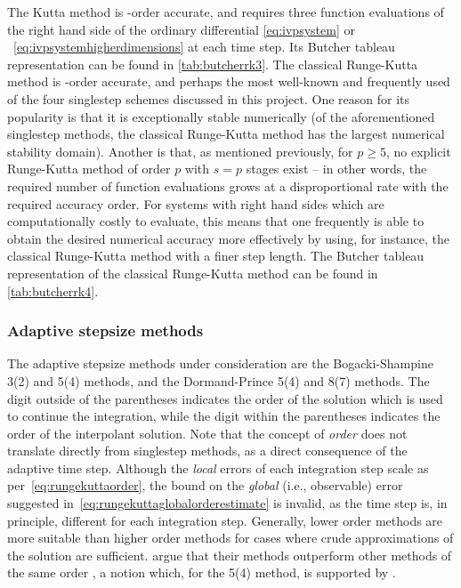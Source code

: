 The Kutta method is -order accurate, and requires three function
evaluations of the right hand side of the ordinary differential
\cref{eq:ivpsystem} or ~\eqref{eq:ivpsystemhigherdimensions} at each time
step. Its Butcher tableau representation can be found in \cref{tab:butcherrk3}.
The classical Runge-Kutta method is -order accurate, and perhaps the most
well-known and frequently used of the four singlestep schemes discussed in this
project. One reason for its popularity is that it is exceptionally stable
numerically (of the aforementioned singlestep methods, the classical
Runge-Kutta method has the largest numerical stability domain). Another is that,
as mentioned previously, for $p\geq5$, no explicit Runge-Kutta method of order
$p$ with $s=p$ stages exist
\parencite[p.173]{hairer1993solving} -- in other words,
the required number of function evaluations grows at a disproportional rate with
the required accuracy order. For systems with right hand sides which are
computationally costly to evaluate, this means that one frequently is able to
obtain the desired numerical accuracy more effectively by using, for instance,
the classical Runge-Kutta method with a finer step length. The Butcher tableau
representation of the classical Runge-Kutta method can be found in
\cref{tab:butcherrk4}.


\clearpage


\subsubsection{Adaptive stepsize methods}
\label{ssub:adaptive_stepsize_methods}

The adaptive stepsize methods under consideration are the Bogacki-Shampine
3(2) and 5(4) methods, and the Dormand-Prince 5(4) and 8(7) methods. The digit
outside of the parentheses indicates the order of the solution which is used
to continue the integration, while the digit within the parentheses indicates
the order of the interpolant solution. Note that the concept of \emph{order}
does not translate directly from singlestep methods, as a direct consequence
of the adaptive time step. Although the \emph{local} errors of each integration
step scale as per~\cref{eq:rungekuttaorder}, the bound on the \emph{global}
(i.e., observable) error suggested in~\cref{eq:rungekuttaglobalorderestimate}
is invalid, as the time step is, in principle, different for each integration
step. Generally, lower order methods are more suitable than higher order methods
for cases where crude approximations of the solution are sufficient.
\citeauthor{bogacki1989pair} argue that their methods
outperform other methods of the same order
\parencite{bogacki1989pair,bogacki1996efficient}, a notion which, for the 5(4)
method, is supported by
\textcite[p.194]{hairer1993solving}.

